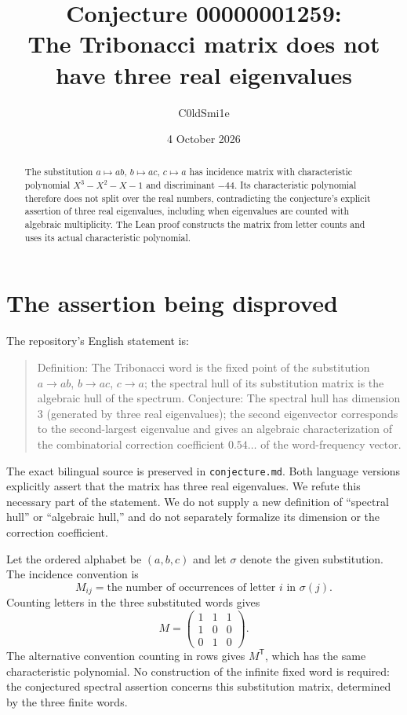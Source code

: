 \documentclass[11pt]{article}
\title{Conjecture 00000001259:\\The Tribonacci matrix does not have three real eigenvalues}
\author{C0ldSmi1e}
\date{4 October 2026}
\begin{document}
\maketitle
\begin{abstract}
The substitution $a\mapsto ab$, $b\mapsto ac$, $c\mapsto a$ has incidence matrix with characteristic polynomial $X^3-X^2-X-1$ and discriminant $-44$. Its characteristic polynomial therefore does not split over the real numbers, contradicting the conjecture's explicit assertion of three real eigenvalues, including when eigenvalues are counted with algebraic multiplicity. The Lean proof constructs the matrix from letter counts and uses its actual characteristic polynomial.
\end{abstract}

\section{The assertion being disproved}
The repository's English statement is:
\begin{quote}
Definition: The Tribonacci word is the fixed point of the substitution $a\to ab$, $b\to ac$, $c\to a$; the spectral hull of its substitution matrix is the algebraic hull of the spectrum. Conjecture: The spectral hull has dimension 3 (generated by three real eigenvalues); the second eigenvector corresponds to the second-largest eigenvalue and gives an algebraic characterization of the combinatorial correction coefficient $0.54\ldots$ of the word-frequency vector.
\end{quote}
The exact bilingual source is preserved in \texttt{conjecture.md}. Both language versions explicitly assert that the matrix has three real eigenvalues. We refute this necessary part of the statement. We do not supply a new definition of ``spectral hull'' or ``algebraic hull,'' and do not separately formalize its dimension or the correction coefficient.

Let the ordered alphabet be $(a,b,c)$ and let $\sigma$ denote the given substitution. The incidence convention is
\[
 M_{ij}=\text{the number of occurrences of letter }i\text{ in }\sigma(j).
\]
Counting letters in the three substituted words gives
\[
 M=\begin{pmatrix}1&1&1\\1&0&0\\0&1&0\end{pmatrix}.
\]
The alternative convention counting in rows gives $M^{\mathsf T}$, which has the same characteristic polynomial. No construction of the infinite fixed word is required: the conjectured spectral assertion concerns this substitution matrix, determined by the three finite words.
\end{document}
